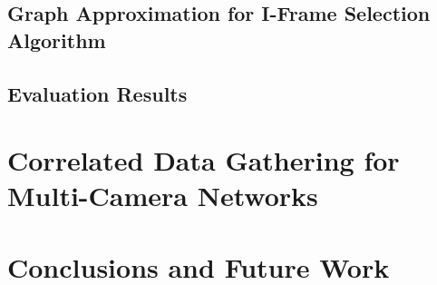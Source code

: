 \documentclass[slidestop,compress,mathserif]{beamer}
\begin{document}
\subsection{Graph Approximation for I-Frame Selection Algorithm}

\subsection{Evaluation Results}


\section{Correlated Data Gathering for Multi-Camera Networks}

\section{Conclusions and Future Work}
%
\end{document}
